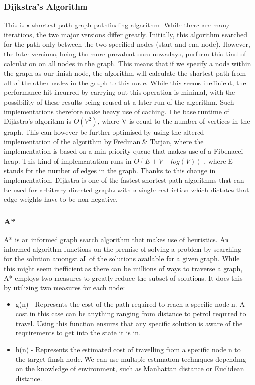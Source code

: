 \documentclass[12pt,a4paper]{report}
\begin{document}
\subsubsection{Dijkstra's Algorithm}
This is a shortest path graph pathfinding algorithm. While there are many iterations, the two major versions differ greatly. Initially, this algorithm searched for the path only between the two specified nodes (start and end node). However, the later versions, being the more prevalent ones nowadays, perform this kind of calculation on all nodes in the graph. This means that if we specify a node within the graph as our finish node, the algorithm will calculate the shortest path from all of the other nodes in the graph to this node. While this seems inefficient, the performance hit incurred by carrying out this operation is minimal, with the possibility of these results being reused at a later run of the algorithm. Such implementations therefore make heavy use of caching. The base runtime of Dijkstra's algorithm is $O(V^2)$, where V is equal to the number of vertices in the graph. This can however be further optimised by using the altered implementation of the algorithm by Fredman \& Tarjan\cite{algoImprovedDijkstra}, where the implementation is based on a min-priority queue that makes use of a Fibonacci heap. This kind of implementation runs in $O( E + V + log(V) )$ , where E stands for the number of edges in the graph. Thanks to this change in implementation, Dijkstra is one of the fastest shortest path algorithms that can be used for arbitrary directed graphs with a single restriction which dictates that edge weights have to be non-negative.


\subsubsection{A*}
A* is an informed graph search algorithm that makes use of heuristics.  An informed algorithm functions on the premise of solving a problem by searching for the solution amongst all of the solutions available for a given graph. While this might seem inefficient as there can be millions of ways to traverse a graph, A* employs two measures to greatly reduce the subset of solutions. It does this by utilizing two measures for each node:
\begin{itemize}
\item g(n) - Represents the cost of the path required to reach a specific node n. A cost in this case can be anything ranging from distance to petrol required to travel. Using this function ensures that any specific solution is aware of the requirements to get into the state it is in.
\item h(n) - Represents the estimated cost of travelling from a specific node n to the target finish node. We can use multiple estimation techniques depending on the knowledge of environment, such as Manhattan distance or Euclidean distance.
\end{itemize}
\end{document}
